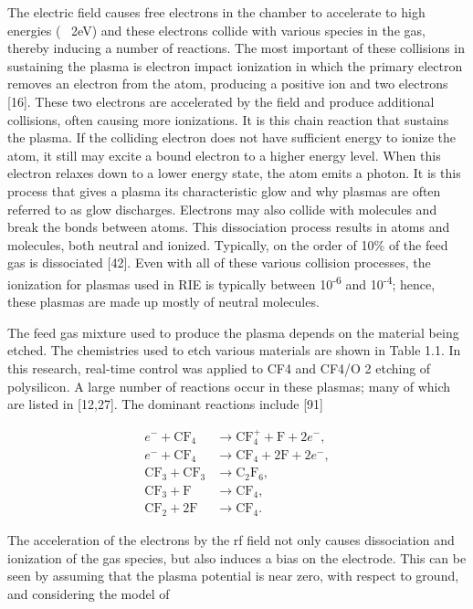 The electric field causes free electrons in the chamber to accelerate to high energies (~ 2eV) and these electrons collide with various species in the gas, thereby inducing a number of reactions. The most important of these collisions in sustaining the plasma is electron impact ionization in which the primary electron removes an electron from the atom, producing a positive ion and two electrons [16]. These two electrons are accelerated by the field and produce additional collisions, often causing more ionizations. It is this chain reaction that sustains the plasma. If the colliding electron does not have sufficient energy to ionize the atom, it still may excite a bound electron to a higher energy level. When this electron relaxes down to a lower energy state, the atom emits a photon. It is this process that gives a plasma its characteristic glow and why plasmas are often referred to as glow discharges. Electrons may also collide with molecules and break the bonds between atoms. This dissociation process results in atoms and molecules, both neutral and ionized. Typically, on the order of 10\% of the feed gas is dissociated [42]. Even with all of these
various collision processes, the ionization for plasmas used in RIE is typically between 10\textsuperscript{-6} and 10\textsuperscript{-4}; hence, these plasmas are made up mostly of neutral molecules.

The feed gas mixture used to produce the plasma depends on the material being etched. The chemistries used to etch various materials are shown in Table 1.1. In this research,
real-time control was applied to CF4 and CF4/O 2 etching of polysilicon. A large number of reactions occur in these plasmas; many of which are listed in [12,27]. The dominant
reactions include [91]


\begin{align}
	e^{-} + \text{CF}_{4} &\rightarrow \text{CF}^{+}_{4} + \text{F} + 2e^{-},\\
	e^{-} + \text{CF}_{4} &\rightarrow \text{CF}_{4} + 2\text{F} + 2e^{-},\\
	\text{CF}_{3} + \text{CF}_{3} &\rightarrow \text{C}_{2}\text{F}_{6},\\
	\text{CF}_{3}+\text{F} &\rightarrow \text{CF}_{4},\\
	\text{CF}_{2}+2\text{F} &\rightarrow \text{CF}_{4}.
\end{align}

The acceleration of the electrons by the rf field not only causes dissociation and ionization of the gas species, but also induces a bias on the electrode. This can be seen by assuming that the plasma potential is near zero, with respect to ground, and considering the model of

